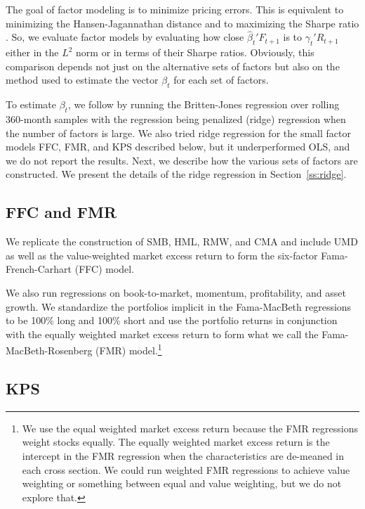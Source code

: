 \documentclass[12pt]{scrarticle}
\begin{document}
The goal of factor modeling is to minimize pricing errors.  This is equivalent to minimizing the Hansen-Jagannathan distance \citep{hj} and to maximizing the Sharpe ratio \citep{barillas-shanken}.  So, we evaluate factor models by evaluating how close $\hat \beta_t'F_{t+1}$ is to $\gamma_t'R_{t+1}$ either in the $L^2$ norm or in terms of their Sharpe ratios.  Obviously, this comparison depends not just on the alternative sets of factors but also on the method used to estimate the vector $\beta_t$ for each set of factors.

To estimate $\beta_t$, we follow \citet{dkkm} by running the Britten-Jones regression over rolling 360-month samples with the regression being penalized (ridge) regression when the number of factors is large.  We also tried ridge regression for the small factor models FFC, FMR, and KPS described below, but it underperformed OLS, and we do not report the results.  Next, we describe how the various sets of factors are constructed.  We present the details of the ridge regression in Section~\ref{ss:ridge}.

\subsection{FFC and FMR}

We replicate the \citet{fama-french-2015} construction of SMB, HML, RMW, and CMA and include UMD as well as the value-weighted market excess return to form the six-factor Fama-French-Carhart (FFC) model.   

We also run \citet{fama-macbeth} regressions on book-to-market, momentum, profitability, and asset growth.  We standardize the portfolios implicit in the Fama-MacBeth regressions \citep{rosenberg, fama76} to be 100\% long and 100\% short and use the portfolio returns in conjunction with the equally weighted market excess return to form what we call the Fama-MacBeth-Rosenberg (FMR) model.\footnote{We use the equal weighted market excess return because the FMR regressions weight stocks equally.  The equally weighted market excess return is the intercept in the FMR regression when the characteristics are de-meaned in each cross section.  We could run weighted FMR regressions to achieve value weighting or something between equal and value weighting, but we do not explore that.} 

 

\subsection{KPS}
\end{document}
